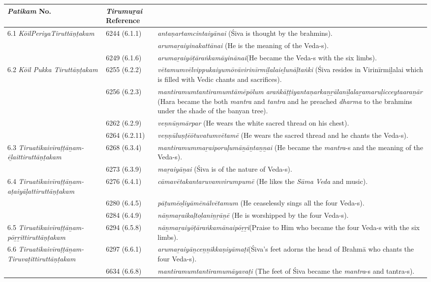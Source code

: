 \begin{longtable}{|m{2.7cm}|m{2.7cm}|>{\raggedright}m{3.1cm}|}
\hline
\multicolumn{1}{|m{2.5cm}}{\centering \textit{Patikam} No.} & \multicolumn{1}{|m{2.5cm}}{\centering \textit{Tirumuṟai} Reference} & \multicolumn{1}{|m{2.5cm}|}{\centering Text} \\
\hline
6.1 \textit{KōilPeriyaTiruttāṇṭakam} & 6244 (6.1.1) & \textit{antaṇartamcintaiyānai}  (Śiva is thought by the brahmins). \tabularnewline
\hline
 &  & \textit{arumaṟaiyinakattānai} (He is the meaning of the Veda-s). \tabularnewline
\hline
 & 6249 (6.1.6) & \textit{arumaṟaiyōṭāraṅkamā\-yinānai}(He became the Veda-s with the six limbs). \tabularnewline
\hline
6.2 \textit{Kōil Pukka Tiruttāṇṭakam} & 6255 (6.2.2) & \textit{vētamumvēlvippukai\-yumōvāvirinīrmiḻalai\-eḻunāḷtaṅki} (Śiva resides in Virinīrmiḻalai which is filled with Vedic chants and sacrifices). \tabularnewline
\hline
 & 6256 (6.2.3) & \textit{mantiramumtantira\-mumtāmēpōlum araṅkāṭṭiyantaṇarkaṉṟālanīḻalaṟamaruḷicceytaaraṉār} (Hara became the both \textit{mantra }and \textit{tantra} and he preached \textit{dharma} to the brahmins under the shade of the banyan tree). \tabularnewline
\hline
 & 6262 (6.2.9) & \textit{veṇnūṉmārpar} (He wears the white sacred thread on his chest). \tabularnewline
\hline
 & 6264 (6.2.11) & \textit{veṇṇūluṇṭēōtuvatum\-vētamē} (He wears the sacred thread and he chants the Veda-s). \tabularnewline
\hline
6.3 \textit{Tiruatikaivīraṭṭāṉam-ēḻaittiruttāṇṭakam} & 6268 (6.3.4) & \textit{mantiramummaṟai\-poruḷumāṉāṉtaṉṉai} (He became the \textit{mantra}-s and the meaning of the Veda-s). \tabularnewline
\hline
 & 6273 (6.3.9) & \textit{maṟaiyāṉai} (Śiva is of the nature of Veda-s). \tabularnewline
\hline
6.4 \textit{Tiruatikaivīraṭṭā\-ṉam-aṭaiyāḷatti\-ruttāṇṭakam} & 6276 (6.4.1) & \textit{cāmavētakantaruvam\-virumpumē} (He likes the \textit{Sāma Veda} and music). \tabularnewline
\hline
 & 6280 (6.4.5) & \textit{pāṭumēoḻiyāmēnālvēta\-mum} (He ceaselessly sings all the four Veda-s). \tabularnewline
\hline
 & 6284 (6.4.9) & \textit{nāṉmaṟaikaḷtoḻaniṉṟāṉē} (He is worshipped by the four Veda-s). \tabularnewline
\hline
6.5 \textit{Tiruatikaivīra\-ṭṭāṉam-pōṟṟitti\-ruttāṇṭakam} & 6294 (6.5.8) & \textit{nāṉmaṟaiyōṭāraṅkamā\-naipōṟṟi}(Praise to Him who became the four Veda-s with the six limbs). \tabularnewline
\hline
6.6 \textit{Tiruatikaivīraṭṭāṉam-Tiruvaṭittiruttāṇ\-ṭakam} & 6297 (6.6.1) & \textit{arumaṟaiyāṉceṉṉikka\-ṇiyāmaṭi}(Śiva’s feet adorns the head of Brahmā who chants the four Veda-s). \tabularnewline
\hline
 & 6634 (6.6.8) & \textit{mantiramumtantira\-mumāyavaṭi} (The feet of Śiva  became the \textit{mantra}-s and tantra-s). \tabularnewline

\end{longtable}
